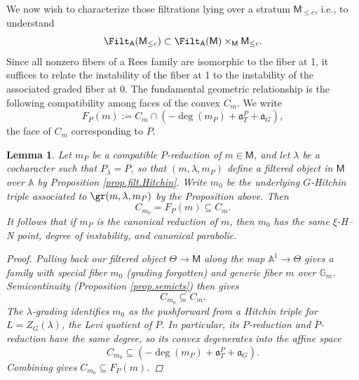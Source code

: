 \documentclass[openany]{amsbook}
\newtheorem{lemma}[theorem]{Lemma}
\theoremstyle{definition}
\theoremstyle{remark}
\numberwithin{equation}{section}
\newcommand{\G}{\mathbb{G}}
\newcommand{\A}{\mathbb{A}}
\newcommand{\ol}[1]{\overline{#1}}
\renewcommand{\-}{\operatorname{-}}
\renewcommand{\a}{\mathfrak{a}}
\renewcommand{\A}{\mathbb{A}}
\newcommand{\bM}{\mathsf{M}}
\newcommand{\bA}{\mathsf{A}}
\begin{document}
We now wish to characterize those filtrations lying over a stratum $\bM_{\le c}$, i.e., to understand
$$
    \Filt_{\bA}(\bM_{\le c}) \subset \Filt_{\bA}(\bM) \times_{\bM} \bM_{\le c}.
$$
Since all nonzero fibers of a Rees family are isomorphic to the fiber at 1, it suffices to relate the instability of the fiber at 1 to the instability of the associated graded fiber at 0. The fundamental geometric relationship is the following compatibility among faces of the convex $C_m$. We write $$F_P(m) := C_m \cap (-\deg(m_P) + \a_T^P + \a_G),$$ the face of $C_m$ corresponding to $P$.

\begin{lemma}\label{lemma.face.compat.assoc.graded}
    Let $m_P$ be a compatible $P$-reduction of $m \in \bM$, and let $\lambda$ be a cocharacter such that $P_\lambda = P$, so that $(m, \lambda, m_P)$ define a filtered object in $\bM$ over $\A$ by Proposition \ref{prop.filt.Hitchin}. Write $m_0$ be the underlying $G$-Hitchin triple associated to $\gr(m, \lambda, m_P)$ by the Proposition above. Then
    \begin{equation}
        C_{m_0} = F_P(m) \subseteq C_m.\label{eqn.face.convex.Levi}
    \end{equation}
    It follows that if $m_P$ is the canonical reduction of $m$, then $m_0$ has the same $\xi$-H--N point, degree of instability, and canonical parabolic.
    \begin{proof}
        Pulling back our filtered object $\Theta \to \bM$ along the map $\A^1 \to \Theta$ gives a family with special fiber $m_0$ (grading forgotten) and generic fiber $m$ over $\G_m$. Semicontinuity (Proposition \ref{prop.semicts}) then gives
        $$
            C_{m_0} \subseteq C_m.
        $$
        The $\lambda$-grading identifies $m_0$ as the pushforward from a Hitchin triple for $L = Z_G(\lambda)$, the Levi quotient of $P$. In particular, its $P$-reduction and $\ol{P}$-reduction have the same degree, so its convex degenerates into the affine space
        $$
            C_{m_0} \subseteq (-\deg(m_P) + \a_T^P + \a_G).
        $$
        Combining gives $C_{m_0} \subseteq F_P(m)$.


\end{proof}
\end{lemma}
\end{document}
